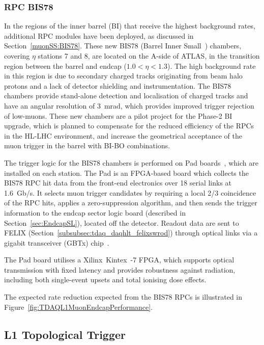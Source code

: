 \documentclass[cernpreprint, atlasdraft=false, UKenglish,british,orcidlogo, texmf, orcidlogo]{atlasdoc}
\begin{document}
\subsubsection{RPC BIS78}
 
In the regions of the inner barrel (BI) that receive the highest background rates, additional \gls{RPC} modules have been deployed, as discussed in Section~\ref{muonSS:BIS78}.  These new \gls{BIS78} (Barrel Inner Small~\cite{ATLAS-TDR-26}) chambers, covering $\eta$ stations 7 and 8, are located on the A-side of ATLAS, in the transition region between the barrel and endcap ($1.0 < \eta < 1.3$).  The high background rate in this region is due to secondary charged tracks originating from beam halo protons and a lack of detector shielding and instrumentation.  The \gls{BIS78} chambers provide stand-alone detection and localisation of charged tracks and have an angular resolution of \SI{3}{\milli\radian}, which provides improved trigger rejection of low-\pT muons.  These new chambers are a pilot project for the Phase-2 BI upgrade, which is planned to compensate for the reduced efficiency of the \glspl{RPC} in the \gls{HL-LHC} environment, and increase the geometrical acceptance of the muon trigger in the barrel with BI-BO combinations.
 
The trigger logic for the \gls{BIS78} chambers is performed on Pad boards~\cite{LoffredoBIS78}, which are installed on each station.  The Pad is an \gls{FPGA}-based board which collects the \gls{BIS78} \gls{RPC} hit data from the front-end electronics over 18 serial links at \SI{1.6}{Gb/\s}.  It selects muon trigger candidates by requiring a local 2/3 coincidence of the \gls{RPC} hits, applies a zero-suppression algorithm, and then sends the trigger information to the endcap sector logic board (described in Section~\ref{sec:EndcapSL}), located off the detector.  Readout data are sent to \gls{FELIX} (Section~\ref{subsubsec:tdaq_daqhlt_felixswrod}) through optical links via a gigabit transceiver (GBTx) chip~\cite{WYLLIE20121561}.
 
The Pad board utilises a Xilinx\textregistered~Kintex\textregistered~-7 \gls{FPGA}, which supports optical transmission with fixed latency and provides robustness against radiation, including both single-event upsets and total ionising dose effects.
 
The expected rate reduction expected from the \gls{BIS78} \glspl{RPC} is illustrated in Figure~\ref{fig:TDAQL1MuonEndcapPerformance}.
 
\subsection{L1 Topological Trigger}\label{sec:TDAQ_L1Topo}
 
\end{document}
